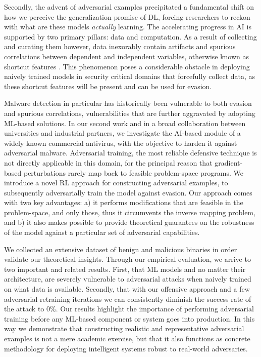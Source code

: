 Secondly, the advent of adversarial examples precipitated a fundamental shift on how we perceive the generalization promise of \gls{DL}, forcing researchers to reckon with what are these models \textit{actually} learning.
The accelerating progress in \gls{AI} is supported by two primary pillars: data and computation.
As a result of collecting and curating them however, data inexorably contain artifacts and spurious correlations between dependent and independent variables, otherwise known as shortcut features \cite{geirhos2020shortcut}.
This phenomenon poses a considerable obstacle in deploying naively trained models in security critical domains that forcefully collect data, as these shortcut features will be present and can be used for evasion.

Malware detection in particular has historically been vulnerable to both evasion and spurious correlations, vulnerabilities that are further aggravated by adopting ML-based solutions.
In our second work and in a broad collaboration between universities and industrial partners, we investigate the \gls{AI}-based module of a widely known commercial antivirus, with the objective to harden it against adversarial malware.
Adversarial training, the most reliable defensive technique is not directly applicable in this domain, for the principal reason that gradient-based perturbations rarely map back to feasible problem-space programs. 
We introduce a novel \gls{RL} approach for constructing adversarial examples, to subsequently adversarially train the model against evasion.
Our approach comes with two key advantages: a) it performs modifications that are feasible in the problem-space, and only those, thus it circumvents the inverse mapping problem, and b) it also makes possible to provide theoretical guarantees on the robustness of the model against a particular set of adversarial capabilities.

We collected an extensive dataset of benign and malicious binaries in order validate our theoretical insights.
Through our empirical evaluation, we arrive to two important and related results.
First, that \gls{ML} models and no matter their architecture, are severely vulnerable to adversarial attacks when naively trained on what data is available.
Secondly, that with our offensive approach and a few adversarial retraining iterations we can consistently diminish the success rate of the attack to 0\%.
Our results highlight the importance of performing adversarial training before any ML-based component or system goes into production.
In this way we demonstrate that constructing realistic and representative adversarial examples is not a mere academic exercise, but that it also functions as concrete methodology for deploying intelligent systems robust to real-world adversaries.

